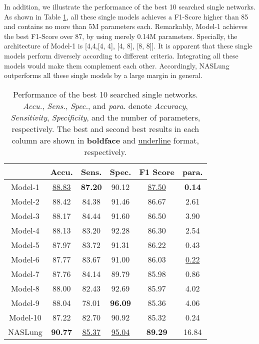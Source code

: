 \documentclass[final,5p,times,twocolumn]{elsarticle}
\begin{document}
In addition, we illustrate the performance of the best 10 searched single networks. As shown in Table \ref{tab:ens_cmp}, all these single models achieves a F1-Score higher than 85 and contains no more than 5M parameters each. Remarkably, Model-1 achieves the best F1-Score over 87, by using merely 0.14M parameters. Specially, the architecture of Model-1 is [4,4,[4, 4], [4, 8], [8, 8]]. It is apparent that these single models perform diversely according to different criteria. Integrating all these models would make them complement each other. Accordingly, NASLung outperforms all these single models by a large margin in general. 

\begin{table}
\centering
\caption{Performance of the best 10 searched single networks. \textit{Accu.}, \textit{Sens.}, \textit{Spec.}, and \textit{para.} denote \textit{Accuracy}, \textit{Sensitivity}, \textit{Specificity}, and the number of parameters, respectively. The best and second best results in each column are shown in \textbf{boldface} and \underline{underline} format, respectively.}
\small
\label{tab:ens_cmp}
\begin{tabular}{c|ccccc}
\toprule
 & Accu.	& Sens.	& Spec.	& F1 Score & para.\\	
\midrule	
Model-1	&	\underline{88.83} 	&	\textbf{87.20} 	&	90.12 	&	\underline{87.50} 	&	\textbf{0.14 }	\\
Model-2	&	88.42 	&	84.38 	&	91.46 	&	86.67 	&	2.61 	\\
Model-3	&	88.17 	&	84.44 	&	91.60 	&	86.50 	&	3.90 	\\
Model-4	&	88.13 	&	83.20 	&	92.28 	&	86.30 	&	2.54 	\\
Model-5	&	87.97 	&	83.72 	&	91.31 	&	86.22 	&	0.43 	\\
Model-6	&	87.77 	&	83.67 	&	91.00 	&	86.03 	&	\underline{0.22} 	\\
Model-7	&	87.76 	&	84.14 	&	89.79 	&	85.98 	&	0.86 	\\
Model-8	&	88.00 	&	82.43 	&	92.69 	&	85.97 	&	4.02 	\\
Model-9	&	88.04 	&	78.01 	&	\textbf{96.09} 	&	85.36 	&	4.06 	\\
Model-10	&	87.22 	&	82.70 	&	90.92 	&	85.32 	&	0.24 	\\
\midrule	
NASLung &	\textbf{90.77}	&	\underline{85.37} 	&	\underline{95.04} 	&	\textbf{89.29} 	&	16.84 	\\
\bottomrule												
\end{tabular}
\end{table}
\end{document}
